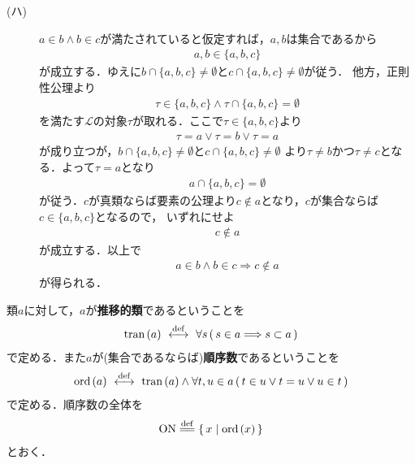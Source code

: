 \begin{prf}
\begin{description}
			\item[(ハ)]
				$a \in b \wedge b \in c$が満たされていると仮定すれば，$a,b$は集合であるから
				\begin{align}
					a,b \in \{a,b,c\}
				\end{align}
				が成立する．ゆえに$b \cap \{a,b,c\} \neq \emptyset$と$c \cap \{a,b,c\} \neq \emptyset$が従う．
				他方，正則性公理より
				\begin{align}
					\tau \in \{a,b,c\} \wedge \tau \cap \{a,b,c\} = \emptyset
				\end{align}
				を満たす$\mathcal{L}$の対象$\tau$が取れる．ここで$\tau \in \{a,b,c\}$より
				\begin{align}
					\tau = a \vee \tau = b \vee \tau = a
				\end{align}
				が成り立つが，$b \cap \{a,b,c\} \neq \emptyset$と$c \cap \{a,b,c\} \neq \emptyset$
				より$\tau \neq b$かつ$\tau \neq c$となる．よって$\tau = a$となり
				\begin{align}
					a \cap \{a,b,c\} = \emptyset
				\end{align}
				が従う．$c$が真類ならば要素の公理より$c \notin a$となり，$c$が集合ならば$c \in \{a,b,c\}$となるので，
				いずれにせよ
				\begin{align}
					c \notin a
				\end{align}
				が成立する．以上で
				\begin{align}
					a \in b \wedge b \in c \Longrightarrow c \notin a
				\end{align}
				が得られる．
				\QED
		\end{description}
	\end{prf}
	
	\begin{screen}
		\begin{dfn}[順序数]
			類$a$に対して，$a$が{\bf 推移的類}であるということを
			\begin{align}
				\operatorname*{tran}\hspace{0.15em}(a) \ \overset{\mathrm{def}}{\longleftrightarrow}\ 
				\forall s\, (\, s \in a \Longrightarrow s \subset a\, )
			\end{align}
			で定める．また$a$が(集合であるならば){\bf 順序数}であるということを
			\begin{align}
				\operatorname*{ord}\hspace{0.15em}(a) \ \overset{\mathrm{def}}{\longleftrightarrow}\ 
				\operatorname*{tran}\hspace{0.15em}(a) \wedge \forall t,u \in a\, (\, t \in u \vee t = u \vee u \in t\, )
			\end{align}
			で定める．順序数の全体を
			\begin{align}
				\ON \defeq \Set{x}{\ord{x}}
			\end{align}
			とおく．
		\end{dfn}
	\end{screen}
	
